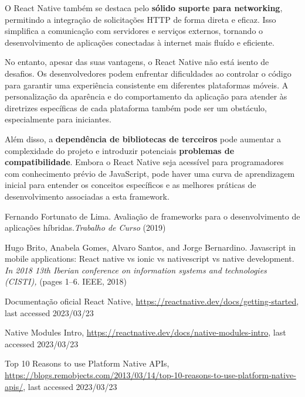 \documentclass[runningheads]{llncs}
\begin{document}
\vspace{3mm}

O React Native também se destaca pelo \textbf{sólido suporte para networking}, permitindo a integração de solicitações HTTP de forma direta e eficaz. Isso simplifica a comunicação com servidores e serviços externos, tornando o desenvolvimento de aplicações conectadas à internet mais fluído e eficiente.

\vspace{3mm}

No entanto, apesar das suas vantagens, o React Native não está isento de desafios. Os desenvolvedores podem enfrentar dificuldades ao controlar o código para garantir uma experiência consistente em diferentes plataformas móveis. A personalização da aparência e do comportamento da aplicação para atender às diretrizes específicas de cada plataforma também pode ser um obstáculo, especialmente para iniciantes.

\vspace{3mm}

Além disso, a \textbf{dependência de bibliotecas de terceiros} pode aumentar a complexidade do projeto e introduzir potenciais \textbf{problemas de compatibilidade}. Embora o React Native seja acessível para programadores com conhecimento prévio de JavaScript, pode haver uma curva de aprendizagem inicial para entender os conceitos específicos e as melhores práticas de desenvolvimento associadas a esta framework.

\vspace{30mm}

%
%
%
% 
% 
%
\begin{thebibliography}{8}
Fernando Fortunato de Lima. Avaliação de frameworks para o desenvolvimento de
aplicações híbridas.\textit{Trabalho de Curso} (2019)

Hugo Brito, Anabela Gomes, Alvaro Santos, and Jorge Bernardino. Javascript in mobile applications: React native vs ionic vs nativescript vs native development.
\textit{In 2018 13th Iberian conference on information systems and technologies (CISTI),}
(pages 1–6. IEEE, 2018)

Documentação oficial React Native, \url{https://reactnative.dev/docs/getting-started}, last accessed 2023/03/23

Native Modules Intro, \url{https://reactnative.dev/docs/native-modules-intro}, last accessed 2023/03/23

Top 10 Reasons to use Platform Native APIs, \url{https://blogs.remobjects.com/2013/03/14/top-10-reasons-to-use-platform-native-apis/}, last accessed 2023/03/23

\end{thebibliography}
\end{document}
